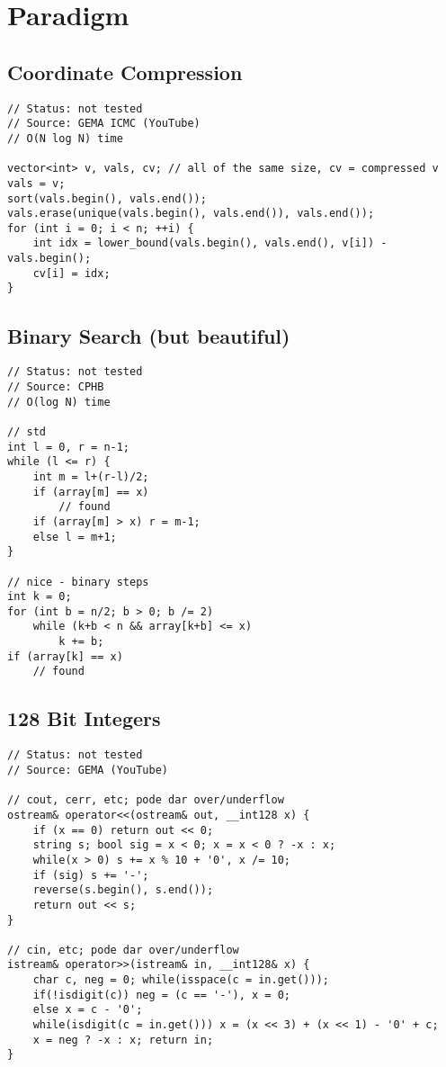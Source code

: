 \documentclass[12pt, a4paper, twoside]{article}
\begin{document}
\section{Paradigm}

\subsection{Coordinate Compression}
\begin{lstlisting}
// Status: not tested
// Source: GEMA ICMC (YouTube)
// O(N log N) time

vector<int> v, vals, cv; // all of the same size, cv = compressed v
vals = v;
sort(vals.begin(), vals.end());
vals.erase(unique(vals.begin(), vals.end()), vals.end());
for (int i = 0; i < n; ++i) {
	int idx = lower_bound(vals.begin(), vals.end(), v[i]) - vals.begin();
	cv[i] = idx;
}
\end{lstlisting}

\subsection{Binary Search (but beautiful)}
\begin{lstlisting}
// Status: not tested
// Source: CPHB
// O(log N) time

// std
int l = 0, r = n-1;
while (l <= r) {
	int m = l+(r-l)/2;
	if (array[m] == x)
		// found
	if (array[m] > x) r = m-1;
	else l = m+1;
}

// nice - binary steps
int k = 0;
for (int b = n/2; b > 0; b /= 2)
	while (k+b < n && array[k+b] <= x)
		k += b;
if (array[k] == x)
	// found
\end{lstlisting}

\subsection{128 Bit Integers}
\begin{lstlisting}
// Status: not tested
// Source: GEMA (YouTube)

// cout, cerr, etc; pode dar over/underflow
ostream& operator<<(ostream& out, __int128 x) {
    if (x == 0) return out << 0;
    string s; bool sig = x < 0; x = x < 0 ? -x : x;
    while(x > 0) s += x % 10 + '0', x /= 10;
    if (sig) s += '-';
    reverse(s.begin(), s.end());
    return out << s;
}

// cin, etc; pode dar over/underflow
istream& operator>>(istream& in, __int128& x) {
    char c, neg = 0; while(isspace(c = in.get()));
    if(!isdigit(c)) neg = (c == '-'), x = 0;
    else x = c - '0';
    while(isdigit(c = in.get())) x = (x << 3) + (x << 1) - '0' + c;
    x = neg ? -x : x; return in;
}
\end{lstlisting}
\end{document}
